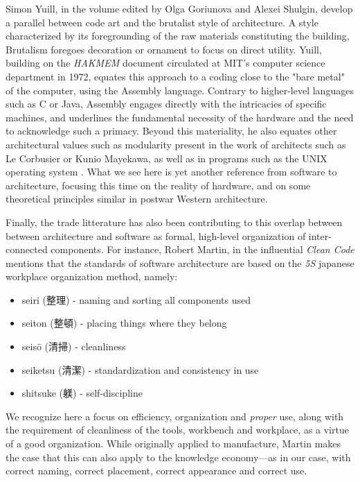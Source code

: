 Simon Yuill, in the volume edited by Olga Goriunova and Alexei Shulgin, develop a parallel between code art and the brutalist style of architecture. A style characterized by its foregrounding of the raw materials constituting the building, Brutalism foregoes decoration or ornament to focus on direct utility. Yuill, building on the \emph{HAKMEM} document circulated at MIT's computer science department in 1972, equates this approach to a coding close to the "bare metal" of the computer, using the Assembly language. Contrary to higher-level languages such as C or Java, Assembly engages directly with the intricacies of specific machines, and underlines the fundamental necessity of the hardware and the need to acknowledge such a primacy. Beyond this materiality, he also equates other architectural values such as modularity present in the work of architects such as Le Corbusier or Kunio Mayekawa, as well as in programs such as the UNIX operating system \citep{yuill_code_2004}. What we see here is yet another reference from software to architecture, focusing this time on the reality of hardware, and on some theoretical principles similar in postwar Western architecture.

Finally, the trade litterature has also been contributing to this overlap between between architecture and software as formal, high-level organization of inter-connected components. For instance, Robert Martin, in the influential \emph{Clean Code} mentions that the standards of software architecture are based on the \emph{5S} japanese workplace organization method, namely:

\begin{itemize}
  \item{seiri (整理) - naming and sorting all components used}
  \item{seiton (整頓) - placing things where they belong}
  \item{seisō (清掃) - cleanliness}
  \item{seiketsu (清潔) - standardization and consistency in use}
  \item{shitsuke (躾) - self-discipline}
\end{itemize}

We recognize here a focus on efficiency, organization and \emph{proper} use, along with the requirement of cleanliness of the tools, workbench and workplace, as a virtue of a good organization. While originally applied to manufacture, Martin makes the case that this can also apply to the knowledge economy—as in our case, with correct naming, correct placement, correct appearance and correct use.


